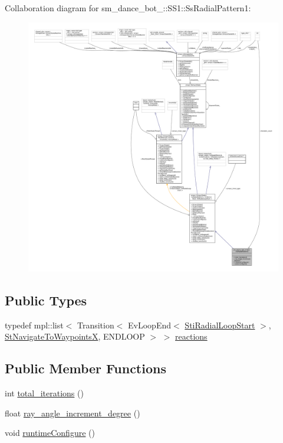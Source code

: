 Collaboration diagram for sm\+\_\+dance\+\_\+bot\+\_\+:\+:S\+S1\+:\+:Ss\+Radial\+Pattern1\+:
\nopagebreak
\begin{figure}[H]
\begin{center}
\leavevmode
\includegraphics[width=350pt]{structsm__dance__bot__2_1_1SS1_1_1SsRadialPattern1__coll__graph}
\end{center}
\end{figure}
\subsection*{Public Types}
\begin{DoxyCompactItemize}
\item 
typedef mpl\+::list$<$ Transition$<$ Ev\+Loop\+End$<$ \hyperlink{structsm__dance__bot__2_1_1radial__motion__states_1_1StiRadialLoopStart}{Sti\+Radial\+Loop\+Start} $>$, \hyperlink{structsm__dance__bot__2_1_1StNavigateToWaypointsX}{St\+Navigate\+To\+WaypointsX}, E\+N\+D\+L\+O\+OP $>$ $>$ \hyperlink{structsm__dance__bot__2_1_1SS1_1_1SsRadialPattern1_ac3147241844d2bd0342377c218ba8362}{reactions}
\end{DoxyCompactItemize}
\subsection*{Public Member Functions}
\begin{DoxyCompactItemize}
\item 
int \hyperlink{structsm__dance__bot__2_1_1SS1_1_1SsRadialPattern1_a14abf04c65ee07d9f4bdc354ed5a23fd}{total\+\_\+iterations} ()
\item 
float \hyperlink{structsm__dance__bot__2_1_1SS1_1_1SsRadialPattern1_aa3c4def707a1731ae0c0527c97c1a3e1}{ray\+\_\+angle\+\_\+increment\+\_\+degree} ()
\item 
void \hyperlink{structsm__dance__bot__2_1_1SS1_1_1SsRadialPattern1_abe0111da8c50276d8e3850e13c79843d}{runtime\+Configure} ()
\end{DoxyCompactItemize}
